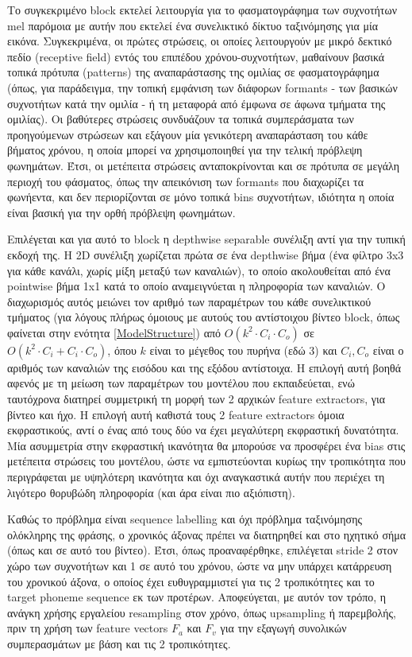 Το συγκεκριμένο block εκτελεί λειτουργία για το φασματογράφημα των συχνοτήτων mel παρόμοια με αυτήν που εκτελεί ένα συνελικτικό δίκτυο ταξινόμησης για μία εικόνα. Συγκεκριμένα, οι πρώτες στρώσεις, οι οποίες λειτουργούν με μικρό δεκτικό πεδίο (receptive field) εντός του επιπέδου χρόνου-συχνοτήτων, μαθαίνουν βασικά τοπικά πρότυπα (patterns) της αναπαράστασης της ομιλίας σε φασματογράφημα (όπως, για παράδειγμα, την τοπική εμφάνιση των διάφορων formants - των βασικών συχνοτήτων κατά την ομιλία - ή τη μεταφορά από έμφωνα σε άφωνα τμήματα της ομιλίας). Οι βαθύτερες στρώσεις συνδυάζουν τα τοπικά συμπεράσματα των προηγούμενων στρώσεων και εξάγουν μία γενικότερη αναπαράσταση του κάθε βήματος χρόνου, η οποία μπορεί να χρησιμοποιηθεί για την τελική πρόβλεψη φωνημάτων. Έτσι, οι μετέπειτα στρώσεις ανταποκρίνονται και σε πρότυπα σε μεγάλη περιοχή του φάσματος, όπως την απεικόνιση των formants που διαχωρίζει τα φωνήεντα, και δεν περιορίζονται σε μόνο τοπικά bins συχνοτήτων, ιδιότητα η οποία είναι βασική για την ορθή πρόβλεψη φωνημάτων.

Επιλέγεται και για αυτό το block η depthwise separable συνέλιξη αντί για την τυπική εκδοχή της. Η 2D συνέλιξη χωρίζεται πρώτα σε ένα depthwise βήμα (ένα φίλτρο 3x3 για κάθε κανάλι, χωρίς μίξη μεταξύ των καναλιών), το οποίο ακολουθείται από ένα pointwise βήμα 1x1 κατά το οποίο αναμειγνύεται η πληροφορία των καναλιών. Ο διαχωρισμός αυτός μειώνει τον αριθμό των παραμέτρων του κάθε συνελικτικού τμήματος (για λόγους πλήρως όμοιους με αυτούς του αντίστοιχου βίντεο block, όπως φαίνεται στην ενότητα \ref{ModelStructure}) από $O(k^2 \cdot C_i \cdot C_o)$ σε $O(k^2 \cdot C_i + C_i \cdot C_o)$, όπου $k$ είναι το μέγεθος του πυρήνα (εδώ 3) και $C_i, C_o$ είναι ο αριθμός των καναλιών της εισόδου και της εξόδου αντίστοιχα. Η επιλογή αυτή βοηθά αφενός με τη μείωση των παραμέτρων του μοντέλου που εκπαιδεύεται, ενώ ταυτόχρονα διατηρεί συμμετρική τη μορφή των 2 αρχικών feature extractors, για βίντεο και ήχο. Η επιλογή αυτή καθιστά τους 2 feature extractors όμοια εκφραστικούς, αντί ο ένας από τους δύο να έχει μεγαλύτερη εκφραστική δυνατότητα. Μία ασυμμετρία στην εκφραστική ικανότητα θα μπορούσε να προσφέρει ένα bias στις μετέπειτα στρώσεις του μοντέλου, ώστε να εμπιστεύονται κυρίως την τροπικότητα που περιγράφεται με υψηλότερη ικανότητα και όχι αναγκαστικά αυτήν που περιέχει τη λιγότερο θορυβώδη πληροφορία (και άρα είναι πιο αξιόπιστη).

Καθώς το πρόβλημα είναι sequence labelling και όχι πρόβλημα ταξινόμησης ολόκληρης της φράσης, ο χρονικός άξονας πρέπει να διατηρηθεί και στο ηχητικό σήμα (όπως και σε αυτό του βίντεο). Έτσι, όπως προαναφέρθηκε, επιλέγεται stride 2 στον χώρο των συχνοτήτων και 1 σε αυτό του χρόνου, ώστε να μην υπάρχει κατάρρευση του χρονικού άξονα, ο οποίος έχει ευθυγραμμιστεί για τις 2 τροπικότητες και το target phoneme sequence εκ των προτέρων. Αποφεύγεται, με αυτόν τον τρόπο, η ανάγκη χρήσης εργαλείου resampling στον χρόνο, όπως upsampling ή παρεμβολής, πριν τη χρήση των feature vectors $F_a$ και $F_v$ για την εξαγωγή συνολικών συμπερασμάτων με βάση και τις 2 τροπικότητες.

